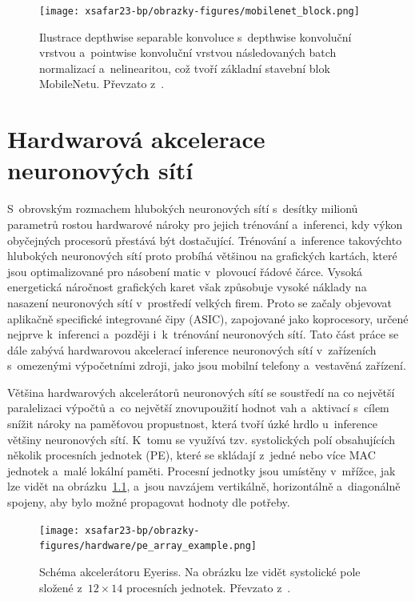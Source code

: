 \begin{figure}[H]
	\centering
	\texttt{[image: xsafar23-bp/obrazky-figures/mobilenet\_block.png]}
	\caption{Ilustrace depthwise separable konvoluce s~depthwise konvoluční vrstvou a~pointwise konvoluční vrstvou následovaných batch normalizací a~nelinearitou, což tvoří základní stavební blok MobileNetu. Převzato z~\cite{howard2017mobilenets}.}
	\label{fig:mobilenet_block} 
\end{figure}


\chapter{Hardwarová akcelerace neuronových sítí}
\label{chapter:hardware_acceleration}

S~obrovským rozmachem hlubokých neuronových sítí s~desítky milionů parametrů rostou hardwarové nároky pro jejich trénování a~inferenci, kdy výkon obyčejných procesorů přestává být dostačující. Trénování a~inference takovýchto hlubokých neuronových sítí proto probíhá většinou na grafických kartách, které jsou optimalizované pro násobení matic v~plovoucí řádové čárce. Vysoká energetická náročnost grafických karet však způsobuje vysoké náklady na nasazení neuronových sítí v~prostředí velkých firem. Proto se začaly objevovat aplikačně specifické integrované čipy (ASIC), zapojované jako koprocesory, určené nejprve k~inferenci a~později i~k~trénování neuronových sítí. Tato část práce se dále zabývá hardwarovou akcelerací inference neuronových sítí v~zařízeních s~omezenými výpočetními zdroji, jako jsou mobilní telefony a~vestavěná zařízení.

Většina hardwarových akcelerátorů neuronových sítí se soustředí na co největší paralelizaci výpočtů a~co největší znovupoužití hodnot vah a~aktivací s~cílem snížit nároky na paměťovou propustnost, která tvoří úzké hrdlo u~inference většiny neuronových sítí. K~tomu se využívá tzv. systolických polí obsahujících několik procesních jednotek (PE), které se skládají z~jedné nebo více MAC jednotek a~malé lokální paměti. Procesní jednotky jsou umístěny v~mřížce, jak lze vidět na obrázku~\ref{fig:systolic_array}, a~jsou navzájem vertikálně, horizontálně a~diagonálně spojeny, aby bylo možné propagovat hodnoty dle potřeby.

\begin{figure}[H]
	\centering
	\texttt{[image: xsafar23-bp/obrazky-figures/hardware/pe\_array\_example.png]}
	\caption{Schéma akcelerátoru Eyeriss. Na obrázku lze vidět systolické pole složené z~$12 \times 14$ procesních jednotek. Převzato z~\cite{7738524}.}
	\label{fig:systolic_array} 
\end{figure}

